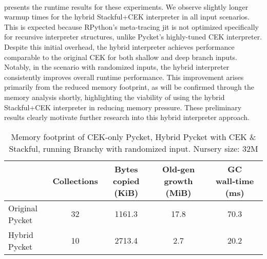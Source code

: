 
      \paragraph{}%
         presents the runtime results for these experiments. We observe slightly longer warmup times for the hybrid Stackful+CEK interpreter in all input scenarios. This is expected because RPython's meta-tracing \gls{jit} is not optimized specifically for recursive interpreter structures, unlike Pycket's highly-tuned CEK interpreter. Despite this initial overhead, the hybrid interpreter achieves performance comparable to the original CEK for both shallow and deep branch inputs. Notably, in the scenario with randomized inputs, the hybrid interpreter consistently improves overall runtime performance. This improvement arises primarily from the reduced memory footprint, as will be confirmed through the memory analysis shortly, highlighting the viability of using the hybrid Stackful+CEK interpreter in reducing memory pressure. These preliminary results clearly motivate further research into this hybrid interpreter approach.

      \begin{table}[!h]
        \centering
        \small
        \begin{tabular}{lcccc}
          \toprule
          & Collections & Bytes copied (KiB) & Old‑gen growth (MiB) & GC wall‑time (ms)\\
          \midrule
          Original Pycket        	& 32   & 1161.3 & 17.8  & 70.3\\
          Hybrid Pycket 				  & 10  &  2713.4 & 2.7 & 20.2\\
          \bottomrule
        \end{tabular}
        \caption{Memory footprint of CEK-only Pycket, Hybrid Pycket with CEK \& Stackful, running Branchy with randomized input. Nursery size: 32M}
        \label{table:memory-footprints-cek-vs-hybrid}
		  \end{table}

